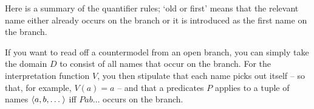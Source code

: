 Here is a summary of the quantifier rules; `old or first' means that the
relevant name either already occurs on the branch or it is introduced as the
first name on the branch.

\bigskip

\begin{minipage}{0.24\textwidth} \centering
{}
\end{minipage}
\begin{minipage}{0.24\textwidth}\centering
{}
\end{minipage}
\begin{minipage}{0.24\textwidth}\centering
{}
\end{minipage}
\begin{minipage}{0.24\textwidth} \centering
{}
\end{minipage}

\medskip

If you want to read off a countermodel from an open branch, you can simply take
the domain $D$ to consist of all names that occur on the branch. For the
interpretation function $V$, you then stipulate that each name picks out itself
-- so that, for example, $V(a) = a$ -- and that a predicates $P$ applies to a
tuple of names $\t{a,b,\ldots}$ iff $Pab\ldots$ occurs on the branch.

